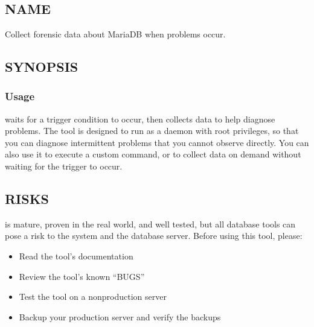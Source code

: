 \documentclass[letterpaper,10pt,english]{sphinxmanual}
\begin{document}
\chapter{}
\label{\detokenize{mariadb-stat:mariadb-stat}}\label{\detokenize{mariadb-stat::doc}}

\section{NAME}
\label{\detokenize{mariadb-stat:name}}
 \sphinxhyphen{} Collect forensic data about MariaDB when problems occur.


\section{SYNOPSIS}
\label{\detokenize{mariadb-stat:synopsis}}

\subsection{Usage}
\label{\detokenize{mariadb-stat:usage}}
\begin{sphinxVerbatim}[commandchars=\\\{\}]
 \PYG{p}{[}\PYG{p}{]}
\end{sphinxVerbatim}

 waits for a trigger condition to occur, then collects data
to help diagnose problems.  The tool is designed to run as a daemon with root
privileges, so that you can diagnose intermittent problems that you cannot
observe directly.  You can also use it to execute a custom command, or to
collect data on demand without waiting for the trigger to occur.


\section{RISKS}
\label{\detokenize{mariadb-stat:risks}}
 is mature, proven in the real world, and well tested,
but all database tools can pose a risk to the system and the database
server.  Before using this tool, please:
\begin{itemize}
\item {} 
Read the tool’s documentation

\item {} 
Review the tool’s known “BUGS”

\item {} 
Test the tool on a non\sphinxhyphen{}production server

\item {} 
Backup your production server and verify the backups

\end{itemize}
\end{document}
